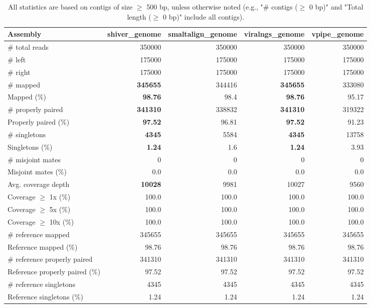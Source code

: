 \documentclass[12pt,a4paper]{article}
\begin{document}
\begin{table}[ht]
\begin{center}
\caption{All statistics are based on contigs of size $\geq$ 500 bp, unless otherwise noted (e.g., "\# contigs ($\geq$ 0 bp)" and "Total length ($\geq$ 0 bp)" include all contigs).}
\begin{tabular}{|l*{4}{|r}|}
\hline
Assembly & shiver\_genome & smaltalign\_genome & viralngs\_genome & vpipe\_genome \\ \hline
\# total reads & 350000 & 350000 & 350000 & 350000 \\ \hline
\# left & 175000 & 175000 & 175000 & 175000 \\ \hline
\# right & 175000 & 175000 & 175000 & 175000 \\ \hline
\# mapped & {\bf 345655} & 344416 & {\bf 345655} & 333080 \\ \hline
Mapped (\%) & {\bf 98.76} & 98.4 & {\bf 98.76} & 95.17 \\ \hline
\# properly paired & {\bf 341310} & 338832 & {\bf 341310} & 319322 \\ \hline
Properly paired (\%) & {\bf 97.52} & 96.81 & {\bf 97.52} & 91.23 \\ \hline
\# singletons & {\bf 4345} & 5584 & {\bf 4345} & 13758 \\ \hline
Singletons (\%) & {\bf 1.24} & 1.6 & {\bf 1.24} & 3.93 \\ \hline
\# misjoint mates & 0 & 0 & 0 & 0 \\ \hline
Misjoint mates (\%) & 0.0 & 0.0 & 0.0 & 0.0 \\ \hline
Avg. coverage depth & {\bf 10028} & 9981 & 10027 & 9560 \\ \hline
Coverage $\geq$ 1x (\%) & 100.0 & 100.0 & 100.0 & 100.0 \\ \hline
Coverage $\geq$ 5x (\%) & 100.0 & 100.0 & 100.0 & 100.0 \\ \hline
Coverage $\geq$ 10x (\%) & 100.0 & 100.0 & 100.0 & 100.0 \\ \hline
\# reference mapped & 345655 & 345655 & 345655 & 345655 \\ \hline
Reference mapped (\%) & 98.76 & 98.76 & 98.76 & 98.76 \\ \hline
\# reference properly paired & 341310 & 341310 & 341310 & 341310 \\ \hline
Reference properly paired (\%) & 97.52 & 97.52 & 97.52 & 97.52 \\ \hline
\# reference singletons & 4345 & 4345 & 4345 & 4345 \\ \hline
Reference singletons (\%) & 1.24 & 1.24 & 1.24 & 1.24 \\ \hline

\end{tabular}
\end{center}
\end{table}
\end{document}
